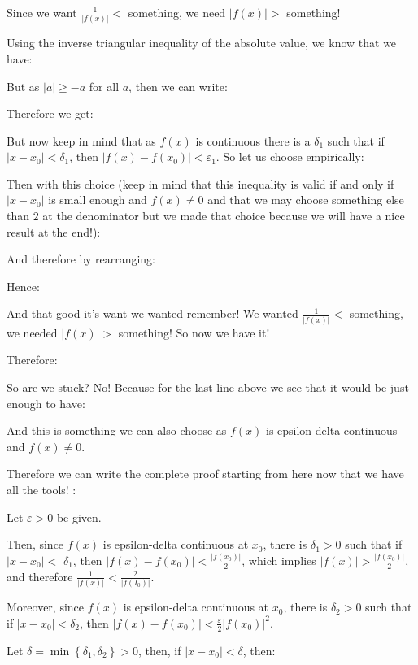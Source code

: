 \begin{enumerate}
		Since we want $\frac{1}{|f(x)|}<$ something, we need $|f(x)|>$ something!
		
		Using the inverse triangular inequality of the absolute value, we know that we have:
		
		But as $|a| \geq-a$ for all $a$, then we can write:
		
		Therefore we get:
		
		But now keep in mind that as $f(x)$ is continuous there is a $\delta_1$ such that if  $\left|x-x_0\right|<\delta_1$, then $\left|f(x)-f\left(x_0\right)\right|<\varepsilon_1$. So let us choose empirically:
		
		Then with this choice (keep in mind that this inequality is valid if and only if $\left|x-x_0\right|$ is small enough and $f(x)\neq 0$ and that we may choose something else than $2$ at the denominator but we made that choice because we will have a nice result at the end!):
		
		And therefore by rearranging:
		
		Hence:
		
		And that good it's want we wanted remember! We wanted $\frac{1}{|f(x)|}<$ something, we needed $|f(x)|>$ something! So now we have it!
		
		Therefore:
		
		So are we stuck? No! Because for the last line above we see that it would be just enough to have:
		
		And this is something we can also choose as $f(x)$ is epsilon-delta continuous and $f(x)\neq 0$.
		
		Therefore we can write the complete proof starting from here now that we have all the tools! :
		
		Let $\varepsilon>0$ be given.
		
		Then, since $f(x)$ is  epsilon-delta continuous at $x_0$, there is $\delta_1>0$ such that if $\left|x-x_0\right|<$ $\delta_1$, then $\left|f(x)-f\left(x_0\right)\right|<\frac{\left|f\left(x_0\right)\right|}{2}$, which implies $|f(x)|>\frac{\left|f\left(x_0\right)\right|}{2}$, and therefore $\frac{1}{|f(x)|}<\frac{2}{\left|f\left(I_0\right)\right|}$.
	
		Moreover, since $f(x)$ is epsilon-delta continuous at $x_0$, there is $\delta_2>0$ such that if $\left|x-x_0\right|<\delta_2$, then $\left|f(x)-f\left(x_0\right)\right|<\frac{\varepsilon}{2}\left|f\left(x_0\right)\right|^2$.
		
		Let $\delta=\min \left\{\delta_1, \delta_2\right\}>0$, then, if $\left|x-x_0\right|<\delta$, then:
			

\end{enumerate}
